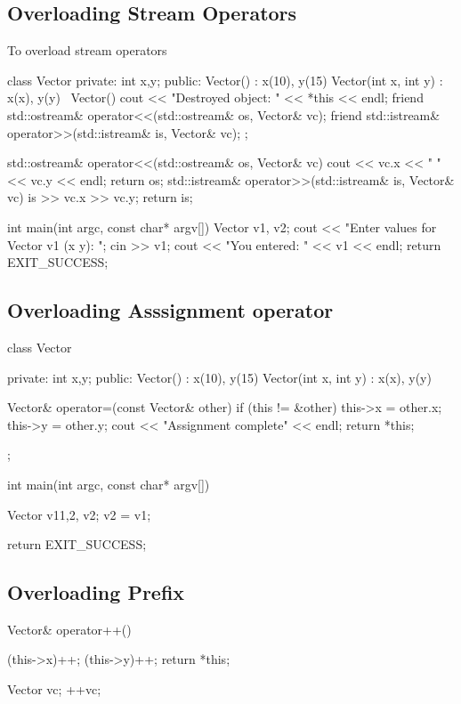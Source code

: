 \documentclass{report}
\begin{document}
    \subsection{Overloading Stream Operators}
    To overload stream operators
    \bigbreak \noindent 
    \begin{cppcode}
class Vector {
    private:
        int x,y;
    public:
        Vector() : x(10), y(15) {}
        Vector(int x, int y) : x(x),  y(y) {}
        ~Vector() {
            cout << "Destroyed object: " << *this << endl;
        }
    friend std::ostream& operator<<(std::ostream& os, Vector& vc);
    friend std::istream& operator>>(std::istream& is, Vector& vc);
};

std::ostream& operator<<(std::ostream& os, Vector& vc) {
    cout << vc.x << " " << vc.y << endl;
    return os;
}
std::istream& operator>>(std::istream& is, Vector& vc) {
    is >> vc.x >> vc.y;
    return is;
}

int main(int argc, const char* argv[]) {
     Vector v1, v2;
    cout << "Enter values for Vector v1 (x y): ";
    cin >> v1;
    cout << "You entered: " << v1 << endl; return EXIT_SUCCESS; }
    \end{cppcode}
    \bigbreak \noindent 

    \pagebreak \bigbreak \noindent 
    \subsection{Overloading Asssignment operator}
    \bigbreak \noindent 
    \begin{cppcode}
class Vector {
    private:
        int x,y;
    public:
        Vector() : x(10), y(15) {}
        Vector(int x, int y) : x(x),  y(y) {}

        Vector& operator=(const Vector& other) {
            if (this != &other) {
                this->x = other.x;
                this->y = other.y;
            }
            cout << "Assignment complete" << endl;
            return *this;
        }
};

int main(int argc, const char* argv[]) {
    Vector v1{1,2}, v2;
    v2 = v1;

    return EXIT_SUCCESS;
}
    \end{cppcode}

    \bigbreak \noindent 
    \subsection{Overloading Prefix}
    \bigbreak \noindent 
    \begin{cppcode}
     Vector& operator++() {
            (this->x)++;
            (this->y)++;
            return *this;

    }
    Vector vc;
    ++vc;
    \end{cppcode}
\end{document}
